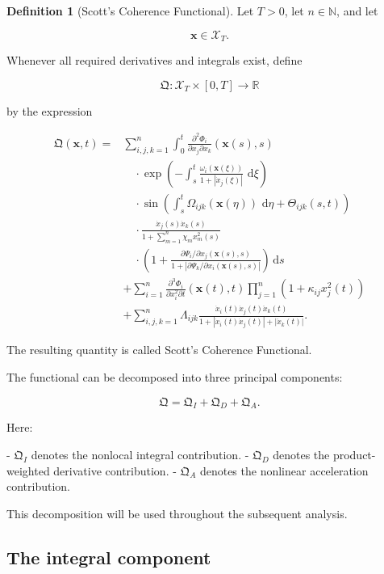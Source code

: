 \documentclass[12pt]{article}
\numberwithin{equation}{section}
\newcommand{\R}{\mathbb{R}}
\newcommand{\N}{\mathbb{N}}
\newcommand{\Q}{\mathfrak{Q}}
\newcommand{\dd}{\,\mathrm{d}}
\theoremstyle{definition}
\newtheorem{definition}[theorem]{Definition}
\theoremstyle{remark}
\begin{document}
\begin{definition}[Scott's Coherence Functional]

Let \(T>0\), let \(n\in\N\), and let

\[
\mathbf{x}\in\mathcal{X}_T.
\]

Whenever all required derivatives and
integrals exist, define

\[
\Q:
\mathcal{X}_T\times[0,T]\to\R
\]

by the expression

\[
\begin{aligned}
\Q(\mathbf{x},t)
={}&
\sum_{i,j,k=1}^{n}
\int_0^t
\frac{\partial^2\Phi_i}
{\partial x_j\partial x_k}
(\mathbf{x}(s),s)
\\
&\quad\cdot
\exp\left(
-\int_s^t
\frac{\omega_i(\mathbf{x}(\xi))}
{1+|\dot{x}_j(\xi)|}
\,\dd\xi
\right)
\\
&\quad\cdot
\sin\left(
\int_s^t
\Omega_{ijk}(\mathbf{x}(\eta))
\,\dd\eta
+\Theta_{ijk}(s,t)
\right)
\\
&\quad\cdot
\frac{\dot{x}_j(s)\dot{x}_k(s)}
{1+\displaystyle\sum_{m=1}^{n}
\chi_mx_m^2(s)}
\\
&\quad\cdot
\left(
1+
\frac{
\partial\Psi_i/\partial x_j
(\mathbf{x}(s),s)
}{
1+
\left|
\partial\Psi_k/\partial x_i
(\mathbf{x}(s),s)
\right|
}
\right)
\dd s
\\[8pt]
&+
\sum_{i=1}^{n}
\frac{\partial^3\Phi_i}
{\partial x_i^2\partial t}
(\mathbf{x}(t),t)
\prod_{j=1}^{n}
(1+\kappa_{ij}x_j^2(t))
\\[8pt]
&+
\sum_{i,j,k=1}^{n}
\Lambda_{ijk}
\frac{
\dot{x}_i(t)\dot{x}_j(t)\ddot{x}_k(t)
}{
1+
|\dot{x}_i(t)\dot{x}_j(t)|
+
|\ddot{x}_k(t)|
}.
\end{aligned}
\tag{2.1}
\]

The resulting quantity is called Scott's
Coherence Functional.

\end{definition}

The functional can be decomposed into
three principal components:

\[
\Q
=
\Q_I+\Q_D+\Q_A.
\]

Here:

- \(\Q_I\) denotes the nonlocal integral contribution.
- \(\Q_D\) denotes the product-weighted derivative contribution.
- \(\Q_A\) denotes the nonlinear acceleration contribution.

This decomposition will be used throughout
the subsequent analysis.

\subsection{The integral component}
\end{document}
